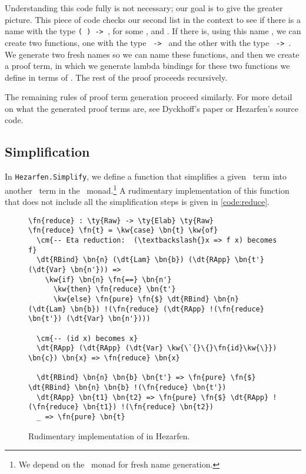 Understanding this code fully is not necessary; our goal is to give the greater
picture. This piece of code checks our second list in the context to see if
there is a name with the type \texttt{(  ) -> },
for some ,  and . If there is, using this name , we can
create two functions, one with the type \texttt{ -> } and the other
with the type \texttt{ -> }. We generate two fresh names so we can
name these functions, and then we create a proof term, in which we generate
lambda bindings for these two functions we define in terms of . The rest
of the proof proceeds recursively.

The remaining rules of proof term generation proceed similarly. For more detail
on what the generated proof terms are, see Dyckhoff's paper or Hezarfen's
source code.


\subsection{Simplification}

In \texttt{Hezarfen.Simplify}, we define a function  that simplifies
a given \Raw\ term into another \Raw\ term in the \Elab\ monad.\footnote{We
depend on the \Elab\ monad for fresh name generation.}
A rudimentary implementation of this function that does not include all the
simplification steps is given in \autoref{code:reduce}.

\begin{figure}[ht]
\caption{Rudimentary implementation of  in Hezarfen.}
\begin{Verbatim}[framesep=2mm, label=\footnotesize{\normalfont{Idris}}, labelposition=topline]
\fn{reduce} : \ty{Raw} -> \ty{Elab} \ty{Raw}
\fn{reduce} \fn{t} = \kw{case} \bn{t} \kw{of}
  \cm{-- Eta reduction:  (\textbackslash{}x => f x) becomes f}
  \dt{RBind} \bn{n} (\dt{Lam} \bn{b}) (\dt{RApp} \bn{t'} (\dt{Var} \bn{n'})) =>
    \kw{if} \bn{n} \fn{==} \bn{n'}
      \kw{then} \fn{reduce} \bn{t'}
      \kw{else} \fn{pure} \fn{$} \dt{RBind} \bn{n} (\dt{Lam} \bn{b}) !(\fn{reduce} (\dt{RApp} !(\fn{reduce} \bn{t'}) (\dt{Var} \bn{n'})))

  \cm{-- (id x) becomes x}
  \dt{RApp} (\dt{RApp} (\dt{Var} \kw{\`{}\{}\fn{id}\kw{\}}) \bn{c}) \bn{x} => \fn{reduce} \bn{x}

  \dt{RBind} \bn{n} \bn{b} \bn{t'} => \fn{pure} \fn{$} \dt{RBind} \bn{n} \bn{b} !(\fn{reduce} \bn{t'})
  \dt{RApp} \bn{t1} \bn{t2} => \fn{pure} \fn{$} \dt{RApp} !(\fn{reduce} \bn{t1}) !(\fn{reduce} \bn{t2})
  _ => \fn{pure} \bn{t}
\end{Verbatim}
\end{figure}

